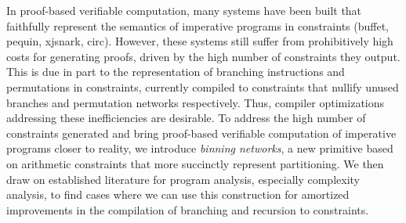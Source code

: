 In proof-based verifiable computation, many systems have been built that faithfully represent the semantics of imperative programs in constraints (buffet, pequin, xjsnark, circ).
However, these systems still suffer from prohibitively high costs for generating proofs, driven by the high number of constraints they output.
This is due in part to the representation of branching instructions and permutations in constraints, currently compiled to constraints that nullify unused branches and permutation networks respectively.
Thus, compiler optimizations addressing these inefficiencies are desirable.
To address the high number of constraints generated and bring proof-based verifiable computation of imperative programs closer to reality, we introduce \textit{binning networks},
a new primitive based on arithmetic constraints that more succinctly represent partitioning. We then draw on established literature for program analysis, especially complexity analysis,
to find cases where we can use this construction for amortized improvements in the compilation of branching and recursion to constraints.